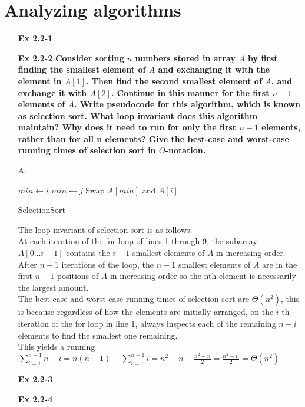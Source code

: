 \documentclass[fontsize=12pt,paper=a4,open=any]{book}
\begin{document}
\section{Analyzing algorithms}
\begin{enumerate}
	\item[\textbf{Ex 2.2-1}]

	\item[\textbf{Ex 2.2-2}]
		\textbf{Consider sorting $n$ numbers stored in array $A$ by first finding the smallest element of $A$ and exchanging it with the element in $A[1]$. Then find the second smallest element of $A$, and exchange it with $A[2]$. Continue in this manner for the first $n-1$ elements of $A$. Write pseudocode for this algorithm, which is known as selection sort. What loop invariant does this algorithm maintain? Why does it need to run for only the first $n-1$ elements, rather than for all n elements? Give the best-case and worst-case running times of selection sort in $\Theta$-notation.}

	\item[A.]
		\begin{algorithm}[H]

			\DontPrintSemicolon

			{
				$min \longleftarrow i$\;
				{
					{
						$min \longleftarrow j$\;
					}
				}
				Swap $A[min]$ and $A[i]$\;
			}
			\caption{SelectionSort}
		\end{algorithm}

			The loop invariant of selection sort is as follows:\\
			At each iteration of the for loop of lines 1 through 9, the subarray $A[0 \dots i-1]$ contains the $i-1$ smallest elements of $A$ in increasing order. After $n-1$ iterations of the loop, the $n-1$ smallest elements of $A$ are in the first $n-1$ positions of $A$ in increasing order so the nth element is necessarily the largest amount.\\
			The best-case and worst-case running times of selection sort are $\Theta(n^2)$, this is because regardless of how the elements are initially arranged, on the $i$-th iteration of the for loop in line 1, always inspects each of the remaining $n-i$ elements to find the smallest one remaining. \\
			This yields a running \\
			$\sum_{i=1}^{n-1} n-i = n(n-1) - \sum_{i=1}^{n-1} i = n^2-n-\frac{n^2-n}{2} = \frac{n^2-n}{2} = \Theta(n^2)$

		\item[\textbf{Ex 2.2-3}]

		\item[\textbf{Ex 2.2-4}]
\end{enumerate}
\end{document}
